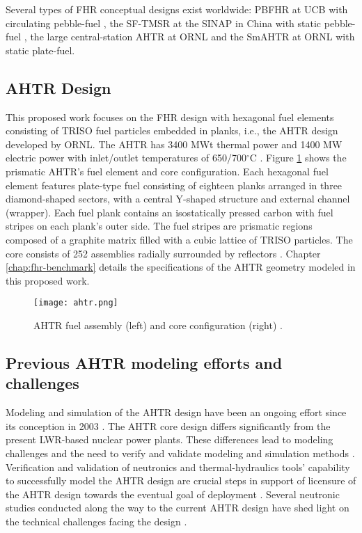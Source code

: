 Several types of \gls{FHR} conceptual designs exist worldwide: \gls{PBFHR} at 
\gls{UCB} with circulating pebble-fuel 
\cite{scarlat_current_2014,krumwiede_three-dimensional_2013}, the \gls{SF-TMSR} 
at the \gls{SINAP} in China with static pebble-fuel \cite{liu_preliminary_2016}, 
the large central-station \gls{AHTR} at \gls{ORNL} \cite{holcomb_core_2011, varma_ahtr_2012} and 
the \gls{SmAHTR} at ORNL \cite{greene_pre-conceptual_2010} with static plate-fuel. 

\subsection{\acrlong{AHTR} Design}
This proposed work focuses on the \gls{FHR} design with hexagonal fuel elements 
consisting of \gls{TRISO} fuel particles embedded in planks, i.e., the 
\gls{AHTR} design developed by ORNL. 
The \gls{AHTR} has 3400 MWt thermal power and 1400 MW electric power with
inlet/outlet temperatures of 650/700$^{\circ}$C \cite{varma_ahtr_2012}.  
Figure \ref{fig:ahtr} shows the prismatic AHTR's fuel element and core 
configuration.  
Each hexagonal fuel element features plate-type fuel consisting of eighteen planks 
arranged in three diamond-shaped sectors, with a central Y-shaped structure 
and external channel (wrapper).
Each fuel plank contains an isostatically pressed carbon with fuel stripes 
on each plank's outer side.
The fuel stripes are prismatic regions composed of a graphite matrix filled with 
a cubic lattice of \gls{TRISO} particles. 
The core consists of 252 assemblies radially surrounded by reflectors
\cite{ramey_monte_2018}. 
Chapter \ref{chap:fhr-benchmark} details the specifications of the AHTR geometry
modeled in this proposed work.

\begin{figure}[H]
    \centering
    \texttt{[image: ahtr.png]} 
    \caption{\acrlong{AHTR} fuel assembly (left) and core configuration (right) 
    \cite{ramey_monte_2018}.}
    \label{fig:ahtr}
\end{figure}

\subsection{Previous AHTR modeling efforts and challenges}
Modeling and simulation of the \gls{AHTR} design have been an ongoing effort 
since its conception in 2003 \cite{forsberg_molten-salt-cooled_2003}. 
The \gls{AHTR} core design differs significantly from the present \gls{LWR}-based 
nuclear power plants. 
These differences lead to modeling challenges and the need to verify and 
validate modeling and simulation methods \cite{ramey_monte_2018}. 
Verification and validation of neutronics and thermal-hydraulics tools' 
capability to successfully model the \gls{AHTR} design are crucial steps 
in support of licensure of the \gls{AHTR} design towards the eventual goal 
of deployment \cite{rahnema_phenomena_2019,rahnema_current_2015}. 
Several neutronic studies conducted along the way to the current \gls{AHTR} 
design have shed light on the technical challenges facing the design 
\cite{ramey_monte_2018,holcomb_fluoride_2013,greene_pre-conceptual_2010}. 


